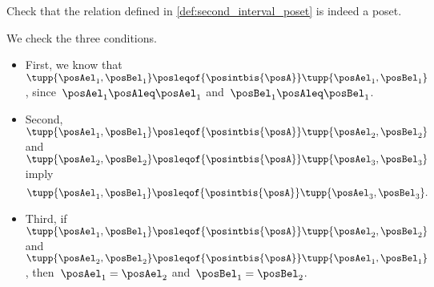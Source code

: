 \begin{exercise}
    Check that the relation defined in \cref{def:second_interval_poset} is indeed a poset.
\end{exercise}
\begin{solution}
    We check the three conditions.
    \begin{itemize}
        \item First, we know that~$\tupp{\posAel_1,\posBel_1}\posleqof{\posintbis{\posA}}\tupp{\posAel_1,\posBel_1}$, since~$\posAel_1\posAleq \posAel_1$ and~$\posBel_1\posAleq \posBel_1$.
        \item Second,~$\tupp{\posAel_1,\posBel_1}\posleqof{\posintbis{\posA}}\tupp{\posAel_2,\posBel_2}$ and~$\tupp{\posAel_2,\posBel_2}\posleqof{\posintbis{\posA}}\tupp{\posAel_3,\posBel_3}$ imply
              \begin{equation}
                  \tupp{\posAel_1,\posBel_1}\posleqof{\posintbis{\posA}}\tupp{\posAel_3,\posBel_3}.
              \end{equation}
        \item Third, if~$\tupp{\posAel_1,\posBel_1}\posleqof{\posintbis{\posA}}\tupp{\posAel_2,\posBel_2}$ and~$\tupp{\posAel_2,\posBel_2}\posleqof{\posintbis{\posA}}\tupp{\posAel_1,\posBel_1}$, then~$\posAel_1=\posAel_2$ and~$\posBel_1=\posBel_2$.
    \end{itemize}
\end{solution}


